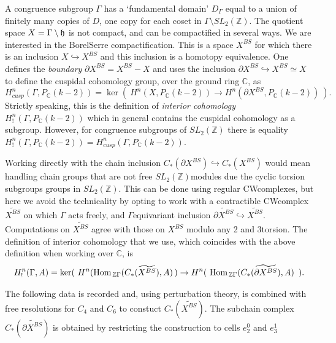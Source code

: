 \documentclass[a4paper,11pt]{report}
\begin{document}
{{ A congruence subgroup $\Gamma$ has a `fundamental domain' $D_\Gamma$ equal to a union of finitely many copies of $D$, one copy for each coset in $\Gamma\setminus SL_2(\mathbb Z)$. The quotient space $X=\Gamma\setminus {\frak h}$ is not compact, and can be compactified in several ways. We are interested in
the Borel\texttt{}Serre compactification. This is a space $X^{BS}$ for which there is an inclusion $X\hookrightarrow X^{BS}$ and this inclusion is a homotopy equivalence. One defines the \emph{boundary} $\partial X^{BS} = X^{BS} - X$ and uses the inclusion $\partial X^{BS} \hookrightarrow X^{BS} \simeq X$ to define the cuspidal cohomology group, over the ground ring $\mathbb C$, as 
\[ H_{cusp}^n(\Gamma,P_{\mathbb C}(k-2)) = \ker (\ H^n(X,P_{\mathbb C}(k-2))
\rightarrow H^n(\partial X^{BS},P_{\mathbb C}(k-2)) \ ).\]
 Strictly speaking, this is the definition of \emph{interior cohomology} $H_!^n(\Gamma,P_{\mathbb C}(k-2))$ which in general contains the cuspidal cohomology as a subgroup. However, for
congruence subgroups of $SL_2(\mathbb Z)$ there is equality $H_!^n(\Gamma,P_{\mathbb C}(k-2)) = H_{cusp}^n(\Gamma,P_{\mathbb C}(k-2))$. 

  Working directly with the chain inclusion $C_\ast (\partial X^{BS}) \hookrightarrow C_\ast (X^{BS})$ would mean handling chain groups that are not free $ SL_2(\mathbb Z)$\texttt{}modules due the cyclic torsion subgroups groups in $SL_2(\mathbb Z)$. This can be done using regular CW\texttt{}complexes, but here we
avoid the technicality by opting to work with a contractible
CW\texttt{}complex $\widetilde {X^{BS}}$ on which $\Gamma$ acts freely, and $\Gamma$\texttt{}equivariant inclusion $\widetilde{\partial X^{BS}} \hookrightarrow \widetilde {X^{BS}}$. Computations on $\widetilde{ X^{BS}}$ agree with those on $X^{BS}$ modulo any 2\texttt{} and 3\texttt{}torsion. The
definition of interior cohomology that we use, which coincides with the above
definition when working over $\mathbb C$, is 
\[ H_{!}^n(\Gamma,A) = \ker (\ H^n({\rm Hom}_{\, \mathbb
Z\Gamma}(C_\ast(\widetilde {X^{BS}}), A)\, ) \rightarrow H^n(\ {\rm Hom}_{\,
\mathbb Z\Gamma}(C_\ast(\widetilde {\partial X^{BS}}), A)\, \ ).\]
 

The following data is recorded and, using perturbation theory, is combined
with free resolutions for $C_4$ and $C_6$ to constuct $C_\ast(\widetilde {X^{BS}})$. The subchain complex $C_\ast(\widetilde {\partial X^{BS}})$ is obtained by restricting the construction to cells $e^0_2$ and $e^1_3$ 

}}
\end{document}

